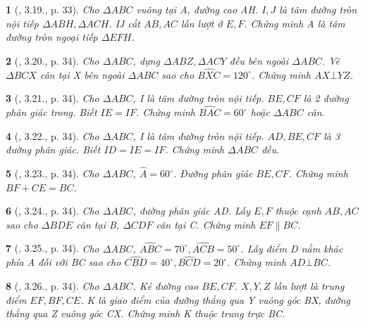 \documentclass{article}
\newtheorem{baitoan}{}
\begin{document}
\begin{baitoan}[\cite{Hung_Mai_Toan_7_hinh_hoc}, 3.19., p. 33]
	Cho $\Delta ABC$ vuông tại A, đường cao AH.  $I,J$ là tâm đường tròn nội tiếp $\Delta ABH,\Delta ACH$. IJ cắt $AB,AC$ lần lượt ở $E,F$. Chứng minh A là tâm đường tròn ngoại tiếp $\Delta EFH$.
\end{baitoan}

\begin{baitoan}[\cite{Hung_Mai_Toan_7_hinh_hoc}, 3.20., p. 34]
	Cho $\Delta ABC$, dựng $\Delta ABZ,\Delta ACY$ đều bên ngoài $\Delta ABC$. Vẽ $\Delta BCX$ cân tại X bên ngoài $\Delta ABC$ sao cho $\widehat{BXC} = 120^\circ$. Chứng minh $AX\bot YZ$.
\end{baitoan}

\begin{baitoan}[\cite{Hung_Mai_Toan_7_hinh_hoc}, 3.21., p. 34]
	Cho $\Delta ABC$, I là tâm đường tròn nội tiếp. $BE,CF$ là 2 đường phân giác trong. Biết $IE = IF$. Chứng minh $\widehat{BAC} = 60^\circ$ hoặc $\Delta ABC$ cân.
\end{baitoan}

\begin{baitoan}[\cite{Hung_Mai_Toan_7_hinh_hoc}, 3.22., p. 34]
	Cho $\Delta ABC$, I là tâm đường tròn nội tiếp. $AD,BE,CF$ là 3 đường phân giác. Biết $ID = IE = IF$. Chứng minh $\Delta ABC$ đều.
\end{baitoan}

\begin{baitoan}[\cite{Hung_Mai_Toan_7_hinh_hoc}, 3.23., p. 34]
	Cho $\Delta ABC$, $\widehat{A} = 60^\circ$. Đường phân giác $BE,CF$. Chứng minh $BF + CE = BC$.
\end{baitoan}

\begin{baitoan}[\cite{Hung_Mai_Toan_7_hinh_hoc}, 3.24., p. 34]
	Cho $\Delta ABC$, đường phân giác AD. Lấy $E,F$ thuộc cạnh $AB,AC$ sao cho $\Delta BDE$ cân tại B, $\Delta CDF$ cân tại C. Chứng minh $EF\parallel BC$.
\end{baitoan}

\begin{baitoan}[\cite{Hung_Mai_Toan_7_hinh_hoc}, 3.25., p. 34]
	Cho $\Delta ABC$, $\widehat{ABC} = 70^\circ,\widehat{ACB} = 50^\circ$. Lấy điểm D nằm khác phía A đối với BC sao cho $\widehat{CBD} = 40^\circ,\widehat{BCD} = 20^\circ$. Chứng minh $AD\bot BC$.
\end{baitoan}

\begin{baitoan}[\cite{Hung_Mai_Toan_7_hinh_hoc}, 3.26., p. 34]
	Cho $\Delta ABC$. Kẻ đường cao $BE,CF$. $X,Y,Z$ lần lượt là trung điểm $EF,BF,CE$. K là giao điểm của đường thẳng qua Y vuông góc BX, đường thẳng qua Z vuông góc CX. Chứng minh K thuộc trung trực BC.
\end{baitoan}
\end{document}

